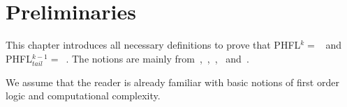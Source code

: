 \chapter{Preliminaries}
\label{sec:preliminaries}
This chapter introduces all necessary definitions to prove that PHFL$^k =$~ and
PHFL$^{k-1}_{tail} =$~. The notions are mainly from~\cite{immerman1999descriptive},~\cite{papadimitriou1994complexity},~\cite{otto1999bisimulation},~\cite{freireMartins2011descriptive}
and~\cite{lange2014capturing}.

We assume that the reader is already familiar with basic notions of first order logic and computational complexity.









